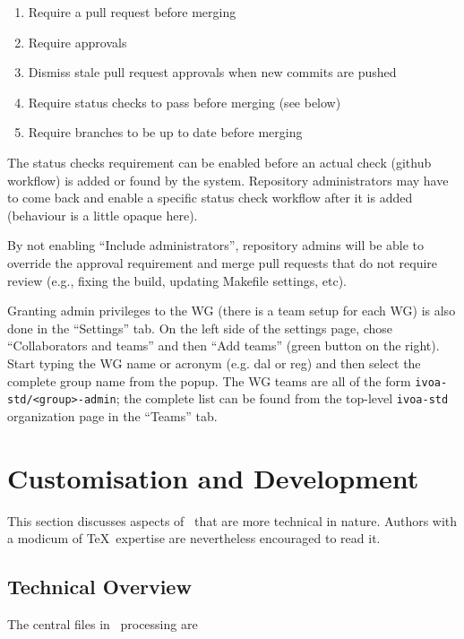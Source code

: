 \documentclass[11pt,a4paper]{ivoa}
\begin{document}
\begin{enumerate}
\item Require a pull request before merging
\item Require approvals
\item Dismiss stale pull request approvals when new commits are pushed
\item Require status checks to pass before merging (see below)
\item Require branches to be up to date before merging
\end{enumerate}

The status checks requirement can be enabled before an actual check (github workflow) is
added or found by the system. Repository administrators may have to come back and enable a 
specific status check workflow after it is added (behaviour is a little opaque here).

By not enabling ``Include administrators'', repository admins will be able to override the 
approval requirement and merge pull requests that do not require review (e.g., fixing the build,
updating Makefile settings, etc).

Granting admin privileges to the WG (there is a team setup for each WG) is also done in the 
``Settings'' tab. On the left side of the settings page, chose ``Collaborators and teams''
and then ``Add teams'' (green button on the right). Start typing the WG name or acronym (e.g.
dal or reg) and then select the complete group name from the popup. The WG teams are all
of the form \verb|ivoa-std/<group>-admin|; the complete list can be found from the top-level 
\verb|ivoa-std| organization page in the ``Teams'' tab.


\section{Customisation and Development}
\label{sect:impl}

This section discusses aspects of \ivoatex\ that are more technical in
nature.  Authors with a modicum of \TeX\ expertise are nevertheless
encouraged to read it.

\subsection{Technical Overview}

The central files in \ivoatex\ processing are
\end{document}

